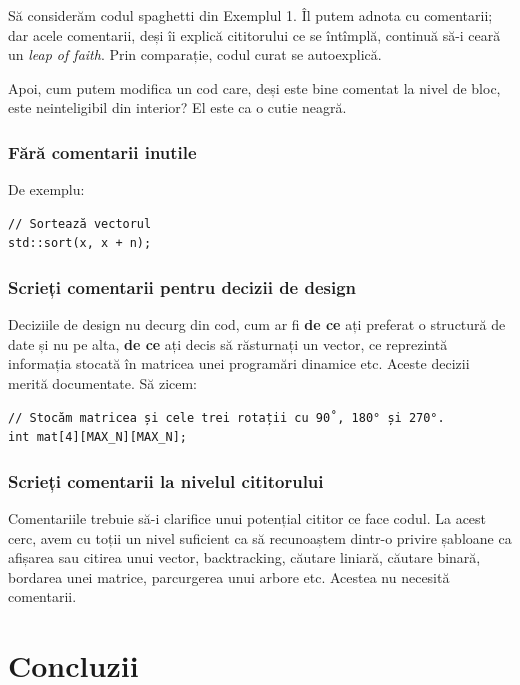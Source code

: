 \documentclass[../main.tex]{subfiles}
\begin{document}
Să considerăm codul spaghetti din Exemplul 1. Îl putem adnota cu comentarii; dar acele comentarii, deși îi explică cititorului ce se întîmplă, continuă să-i ceară un \textit{leap of faith}. Prin comparație, codul curat se autoexplică.

Apoi, cum putem modifica un cod care, deși este bine comentat la nivel de bloc, este neinteligibil din interior? El este ca o cutie neagră.

\subsubsection*{Fără comentarii inutile}

De exemplu:

\begin{verbatim}
// Sortează vectorul
std::sort(x, x + n);
\end{verbatim}

\subsubsection*{Scrieți comentarii pentru decizii de design}

Deciziile de design nu decurg din cod, cum ar fi \textbf{de ce} ați preferat o structură de date și nu pe alta, \textbf{de ce} ați decis să răsturnați un vector, ce reprezintă informația stocată în matricea unei programări dinamice etc. Aceste decizii merită documentate. Să zicem:

\begin{verbatim}
// Stocăm matricea și cele trei rotații cu 90˚, 180° și 270°.
int mat[4][MAX_N][MAX_N];
\end{verbatim}

\subsubsection*{Scrieți comentarii la nivelul cititorului}

Comentariile trebuie să-i clarifice unui potențial cititor ce face codul. La acest cerc, avem cu toții un nivel suficient ca să recunoaștem dintr-o privire șabloane ca afișarea sau citirea unui vector, backtracking, căutare liniară, căutare binară, bordarea unei matrice, parcurgerea unui arbore etc. Acestea nu necesită comentarii.

\section{Concluzii}
\end{document}
